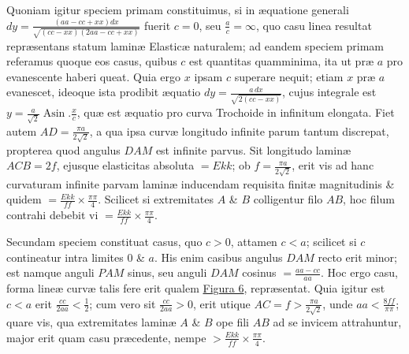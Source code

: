 Quoniam igitur speciem primam constituimus, si in æquatione generali $dy=\frac{(aa-cc+xx)dx}{\sqrt{(cc-xx)(2aa-cc+xx)}}$ fuerit $c=0$, seu $\frac ac=\infty$, quo casu linea resultat repræsentans statum laminæ Elasticæ naturalem; ad eandem speciem primam referamus quoque eos casus, quibus $c$ est quantitas quamminima, ita ut præ $a$ pro evanescente haberi queat. Quia ergo $x$ ipsam $c$ superare nequit; etiam $x$ præ $a$ evanescet, ideoque ista prodibit æquatio $dy=\frac{a\,dx}{\sqrt{2(cc-xx)}}$, cujus integrale est $y=\frac a{\sqrt2}\operatorname{Asin}.\frac xc$, quæ est æquatio pro curva Trochoide in infinitum elongata. Fiet autem $AD=\frac{\pi a}{2\sqrt2}$, a qua ipsa curvæ longitudo infinite parum tantum discrepat, propterea quod angulus $DAM$ est infinite parvus. Sit longitudo laminæ $ACB=2f$, ejusque elasticitas absoluta $=Ekk$; ob $f=\frac{\pi a}{2\sqrt2}$, erit vis ad hanc curvaturam infinite parvam laminæ inducendam
requisita finitæ magnitudinis \& quidem $=\frac{Ekk}{ff}\times\frac{\pi\pi}4$. Scilicet si extremitates $A$ \& $B$ colligentur filo $AB$, hoc filum contrahi debebit vi $=\frac{Ekk}{ff}\times\frac{\pi\pi}4$.

Secundam speciem constituat casus, quo $c>0$, attamen $c<a$; scilicet si $c$ contineatur intra limites $0$ \& $a$. His enim casibus angulus $DAM$ recto erit minor; est namque anguli $PAM$ sinus, seu anguli $DAM$ cosinus $=\frac{aa-cc}{aa}$. Hoc ergo casu, forma lineæ curvæ talis fere erit qualem \hyperlink{addfig:6}{Figura 6}, repræsentat. Quia igitur est $c<a$ erit $\frac{cc}{2aa}<\frac12$; cum vero sit $\frac{cc}{2aa}>0$, erit utique $AC=f>\frac{\pi a}{2\sqrt2}$, unde $aa<\frac{8ff}{\pi\pi}$; quare vis, qua extremitates laminæ $A$ \& $B$ ope fili $AB$ ad se invicem attrahuntur, major erit quam casu præcedente, nempe $>\frac{Ekk}{ff}\times\frac{\pi\pi}4$.

